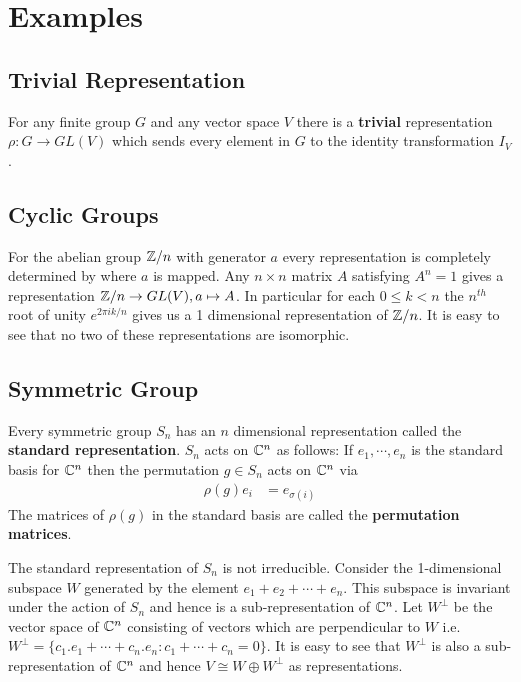 \section{Examples}

\subsection{Trivial Representation}
For any finite group $G$ and any vector space $V$ there is a \textbf{trivial} representation $\rho : G \rightarrow GL(V)$ which sends every element in $G$ to the identity transformation $I_V$.

\subsection{Cyclic Groups}
For the abelian group $\mathbb{Z}/n$ with generator $a$ every representation is completely determined by where $a$ is mapped. Any $n \times n$ matrix $A$ satisfying $A^n = 1$ gives a representation $\mathbb{Z}/n \rightarrow GL(V), a \mapsto A$. In particular for each $0 \le k < n$ the $n^{th}$ root of unity $e^{2 \pi i k/n}$ gives us a 1 dimensional representation of $\mathbb{Z}/n$. It is easy to see that no two of these representations are isomorphic.



\subsection{Symmetric Group}
Every symmetric group $S_n$ has an $n$ dimensional representation called the \textbf{standard representation}. $S_n$ acts on $\mathbb{C}^n$ as follows: If $e_1, \cdots, e_n$ is the standard basis for $\mathbb{C}^n$ then the permutation $g \in S_n$ acts on $\mathbb{C}^n$ via
\begin{align}
	\rho(g){e _ i} & = e_ {\sigma(i)}
\end{align}
The matrices of $\rho(g)$ in the standard basis are called the \textbf{permutation matrices}.

The standard representation of $S_n$ is not irreducible. Consider the 1-dimensional subspace $ W$ generated by the element $e_1 + e_2 + \cdots + e_n$. This subspace is invariant under the action of $S_n$ and hence is a sub-representation of $\mathbb{C}^n$. Let $W^{\perp}$ be the vector space of $\mathbb{C}^n$ consisting of vectors which are perpendicular to $W$ i.e. $W^{\perp} = \{ c_1.e_1 + \cdots + c_n.e_n  : c_1 + \cdots + c_n = 0\}$. It is easy to see that $W^{\perp}$ is also a sub-representation of $\mathbb{C}^n$ and hence $V \cong W \oplus W^{\perp}$ as representations.

